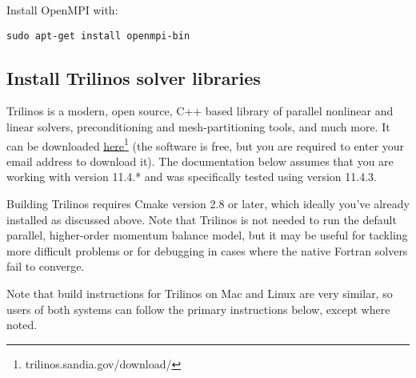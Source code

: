 \begin{mdframed}[style=mac]
%
%

\end{mdframed}              %



\begin{mdframed}[style=ubuntu] %
Install OpenMPI with:

\texttt{sudo apt-get install openmpi-bin}
\end{mdframed}                 %



\subsection{Install Trilinos solver libraries}

Trilinos is a modern, open source, C++ based library of parallel nonlinear and linear solvers, 
preconditioning and mesh-partitioning tools, and much more. It can be downloaded 
\href{trilinos.sandia.gov/download/}{here}\footnote{trilinos.sandia.gov/download/}
 (the software is free, but you are required to enter your email address to download it). 
The documentation below assumes that you are working with version 11.4.* and was specifically 
tested using version 11.4.3. 

Building Trilinos requires Cmake version 2.8 or later, which ideally you've already 
installed as discussed above. Note that Trilinos is not needed to run the default 
parallel, higher-order momentum balance model, but it may be useful for tackling 
more difficult problems or for debugging in cases where the native Fortran solvers 
fail to converge.

Note that build instructions for Trilinos on Mac and Linux are very similar, so users
of both systems can follow the primary instructions below, except where noted.

